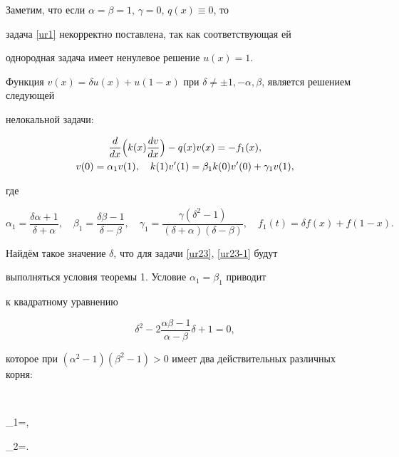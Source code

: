 \smallskip



Заметим, что если $\alpha=\beta=1$, $\gamma=0$, $q(x)\equiv 0$, то

задача \eqref{ur1} некорректно поставлена, так как соответствующая ей

однородная задача имеет ненулевое решение $u(x)=1$.





Функция $v(x)=\delta u(x)+u(1-x)$  при $\delta\neq\pm1,-\alpha,\beta$, является решением следующей

нелокальной задачи:

\begin{gather}

\label{ur23}

\frac{d}{dx}\Bigl(k(x)\frac{dv}{dx}\Bigr)-q(x)v(x)=-f_1(x), \\

v(0)=\alpha_1 v(1), 

\quad  k(1)v'(1)=\beta_1 k(0)v'(0)+\gamma_1 v(1),

\label{ur23-1}

\end{gather}

где

$$

\alpha_1=\frac{\delta\alpha+1}{\delta+\alpha},\quad

\beta_1=\frac{\delta\beta-1}{\delta-\beta},\quad

\gamma_1=\frac{\gamma(\delta^2-1)}{(\delta+\alpha)(\delta-\beta)},\quad

f_1(t)=\delta f(x)+f(1-x).

$$



Найдём такое значение $\delta$, что для задачи \eqref{ur23}, \eqref{ur23-1} будут

выполняться условия теоремы 1. Условие $\alpha_1=\beta_1$ приводит

 к квадратному уравнению

$$

\delta^2-2\frac{\alpha\beta-1}{\alpha-\beta}\delta+1=0,

$$

которое при $(\alpha^2-1)(\beta^2-1)>0$ имеет два действительных различных корня:

$$

\delta_1=,\quad

\delta_2=.

